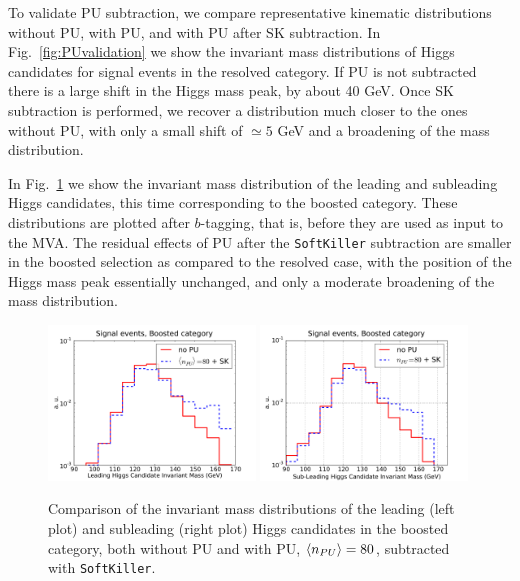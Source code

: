 To validate PU subtraction,
we compare representative kinematic distributions
without PU, with PU, and with PU after SK subtraction.
%
In Fig.~\ref{fig:PUvalidation} we show the
invariant mass distributions of Higgs candidates for signal
events in the resolved category.
%
If PU is not subtracted there is a large shift in the Higgs mass
peak, by about 40 GeV.
%
Once SK subtraction is performed, we recover a distribution much closer
to the ones without PU, with only a small shift of $\simeq 5$ GeV
and a broadening of the mass
distribution.
%

In Fig.~\ref{fig:m_H_PU} we show the invariant mass distribution
of the leading and subleading Higgs candidates,
this time corresponding
to the boosted category.
%
These distributions are plotted after
$b$-tagging, that is,
before they are used as input to the MVA.
%
The residual effects of PU
after the {\tt SoftKiller} subtraction are smaller
in the boosted selection as compared to the resolved case,
with the position of the Higgs mass peak essentially
unchanged, and only a moderate broadening of the
mass distribution.
%

\begin{figure}[t]
  \begin{center}
      \includegraphics[width=0.49\textwidth]{plots/m_H0_bst_comp.pdf}
      \includegraphics[width=0.49\textwidth]{plots/m_H1_bst_comp.pdf}
  \caption{\small
    Comparison of the invariant mass distributions of the leading (left plot)
    and subleading (right plot) Higgs candidates
    in the boosted category,
    both without PU and with
    PU, $\left\langle n_{PU}\right\rangle=80$, subtracted with {\tt SoftKiller}.
}
\label{fig:m_H_PU}
\end{center}
\end{figure}

